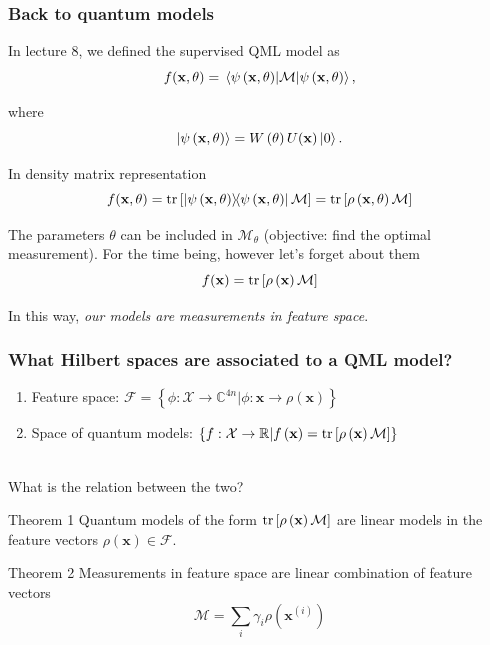 \documentclass[aspectratio=43]{beamer}
\newcommand{\R}{\mathbb{R}}  %
\begin{document}
\begin{frame}
  \frametitle{Back to quantum models}

  In lecture 8, we defined the supervised QML model as
  \[f(\mathbf{x}, \theta) = \ev{\mathcal{M}}{\psi\left( \mathbf{x}, \theta \right)},\]

  where
  \[\ket{\psi\left( \mathbf{x}, \theta \right)} = W\left( \theta \right) U(\mathbf{x}) \ket{0}.\]

  \pause
  In density matrix representation
  \[f(\mathbf{x}, \theta) = \tr\left[ \ketbra{\psi\left( \mathbf{x},\theta \right)}\mathcal{M} \right] = \tr\left[\rho\left( \mathbf{x},\theta \right)\mathcal{M}\right]\]

  \pause
  The parameters $\theta$ can be included in $\mathcal{M}_\theta$ (objective: find the optimal measurement). For the time being, however let's forget about them
  \[f(\mathbf{x})=\tr\left[\rho\left( \mathbf{x} \right)\mathcal{M}\right]\]

  \pause
  In this way, \emph{our models are measurements in feature space}.

\end{frame}


\begin{frame}
  \frametitle{What Hilbert spaces are associated to a QML model?}

  \begin{enumerate}
    \item Feature space: $\mathcal{F}=\left\{ \phi:\mathcal{X}\rightarrow \mathbb{C}^{4n}| \phi:\mathbf{x}\rightarrow \rho\left( \mathbf{x} \right) \right\}$
    \item Space of quantum models: $\left\{ f:\mathcal{X}\rightarrow\R| f\left( \mathbf{x} \right)=\tr\left[ \rho\left( \mathbf{x} \right)\mathcal{M} \right] \right\}$
  \end{enumerate}

  \ \\
  What is the relation between the two?
  \pause
  \begin{block}{Theorem 1}
    Quantum models of the form $\tr\left[\rho\left( \mathbf{x} \right)\mathcal{M}\right]$ are linear models in the feature vectors $\rho\left( \mathbf{x} \right)\in \mathcal{F}$.
  \end{block}

  \pause
  \begin{block}{Theorem 2}
    Measurements in feature space are linear combination of feature vectors
    \[\mathcal{M} = \sum_i \gamma_i \rho\left( \mathbf{x}^{(i)} \right)\]
  \end{block}

\end{frame}
\end{document}
